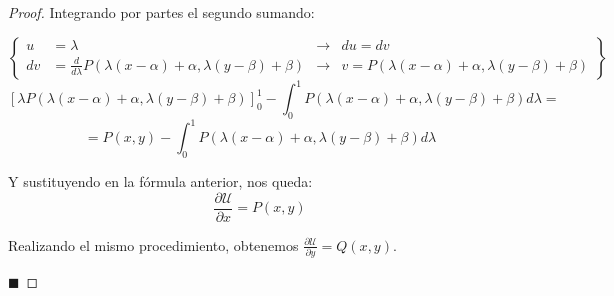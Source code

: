 \documentclass[12pt]{article}
\newcommand{\U}{\mathcal{U}}
\newcommand{\qued}{\hfill$\blacksquare$}
\newtheorem{proof}{Demostración:}
\begin{document}
\begin{proof}
Integrando por partes el segundo sumando:

\[
\left \{ 
\begin{array}{llll}
u & = \lambda &\longrightarrow & du=dv\\
dv & = \frac{d}{d\lambda}P(\lambda(x-\alpha)+\alpha,\lambda(y-\beta)+\beta) &\longrightarrow & v=P(\lambda(x-\alpha)+\alpha,\lambda(y-\beta)+\beta)
\end{array}
\right\}
\]
\[
[\lambda P(\lambda(x-\alpha)+\alpha,\lambda(y-\beta)+\beta)]^1_0-\int_0^1P(\lambda(x-\alpha)+\alpha,\lambda(y-\beta)+\beta)d\lambda=
\]
\[
=P(x,y)-\int_0^1P(\lambda(x-\alpha)+\alpha,\lambda(y-\beta)+\beta)d\lambda
\]

Y sustituyendo en la fórmula anterior, nos queda:
\[
\frac{\partial \U}{\partial x} = P(x,y)
\]

Realizando el mismo procedimiento, obtenemos $\displaystyle\frac{\partial \U}{\partial y}=Q(x,y)$. 

\qued

\end{proof}
\end{document}
